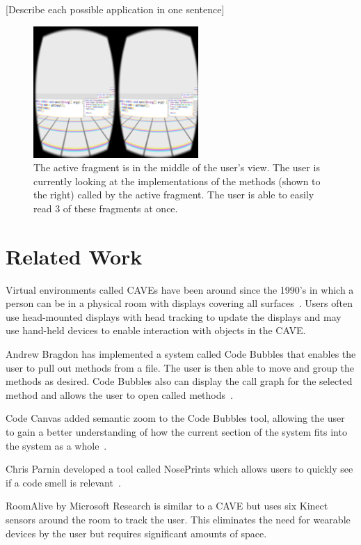 \documentclass{acm_proc_article-sp}
\begin{document}
[Describe each possible application in one sentence]

\begin{figure}[ht]
\centering
\includegraphics[width=\textwidth,height=5cm]{figures/stack}
\caption{The active fragment is in the middle of the user's view. The user is currently looking at the implementations of the methods (shown to the right) called by the active fragment. The user is able to easily read 3 of these fragments at once.  \label{immersion}}
\end{figure}

\section{Related Work}
Virtual environments called CAVEs have been around since the 1990's in which a person can be in a physical room with displays covering all surfaces~\cite{Cruz-Neira:CAVE}.  Users often use head-mounted displays with head tracking to update the displays and may use hand-held devices to enable interaction with objects in the CAVE.

Andrew Bragdon has implemented a system called Code Bubbles that enables the user to pull out methods from a file. The user is then able to move and group the methods as desired.  Code Bubbles also can display the call graph for the selected method and allows the user to open called methods~\cite{Bragdon:CodeBubbles}.

Code Canvas added semantic zoom to the Code Bubbles tool, allowing the user to gain a better understanding of how the current section of the system fits into the system as a whole~\cite{DeLine:CodeCanvas}.

Chris Parnin developed a tool called NosePrints which allows users to quickly see if a code smell is relevant~\cite{parnin:Noseprints}.

RoomAlive by Microsoft Research is similar to a CAVE but uses six Kinect sensors around the room to track the user.  This eliminates the need for wearable devices by the user but requires significant amounts of space.~\cite{Jones:RoomAlive}
\end{document}
